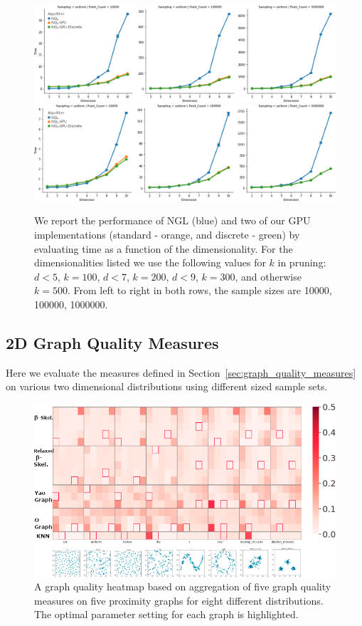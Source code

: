 \begin{figure}[htbp]
    \includegraphics[width=\linewidth]{figs/chap7/strict_performance_d.png}
    \includegraphics[width=\linewidth]{figs/chap7/relaxed_performance_d.png}
    \caption{We report the performance of NGL (blue) and two of our GPU
    implementations (standard - orange, and discrete - green) by
    evaluating time as a function of the dimensionality. For the
    dimensionalities listed we use the following values for $k$ in
    pruning: $d < 5$, $k=100$, $d < 7$, $k=200$, $d < 9$, $k=300$, and
    otherwise $k=500$. From left to right in both rows, the sample sizes
    are 10000, 100000, 1000000.}
    \label{fig:performance}
\end{figure}

\subsection{2D Graph Quality Measures}

Here we evaluate the measures defined in Section~\ref{sec:graph_quality_measures}
on various two dimensional distributions using different sized sample sets.

\begin{figure}[htbp]
  \includegraphics[width=\linewidth]{figs/chap7/Combined5graphs.png}
  \caption{A graph quality heatmap based on aggregation of five graph quality measures on five proximity graphs for eight different distributions.
  The optimal parameter setting for each graph is highlighted.}
  \label{fig:teaser}
\end{figure}

